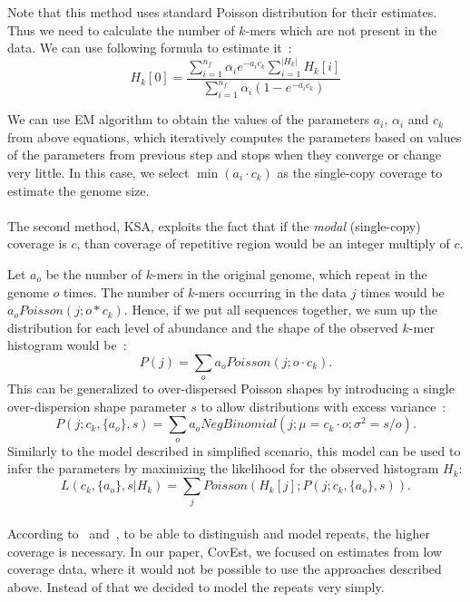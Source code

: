 Note that this method uses standard Poisson distribution for their estimates. Thus we need to calculate the number of $k$-mers which are not present in the data. We can use following formula to estimate it~\cite{waterman}:
$$H_k[0] = \frac{\displaystyle\sum_{i=1}^{n_f}\alpha_i e^{-a_i c_k} \sum_{i=1}^{|H_k|}H_k[i]}{\displaystyle\sum_{i=1}^{n_f}\alpha_i\left(1 - e^{-a_i c_k}\right)}$$

We can use EM algorithm to obtain the values of the parameters $a_i,\, \alpha_i$ and $c_k$ from above equations, which iteratively computes the parameters based on values of the parameters from previous step and stops when they converge or change very little. In this case, we select $\min(a_i \cdot c_k)$ as the single-copy coverage to estimate the genome size.

\paragraph{}The second method, KSA\cite{williams}, exploits the fact that if the \emph{modal} (single-copy) coverage is $c$, than coverage of repetitive region would be an integer multiply of $c$.

Let $a_o$ be the number of $k$-mers in the original genome, which repeat in the genome $o$ times.
The number of $k$-mers occurring in the data $j$ times would be $a_o Poisson(j; o*c_k)$. Hence, if we put all sequences together, we sum up the distribution for each level of abundance and the shape of the observed $k$-mer histogram would be~\cite{williams}:
$$P(j) = \sum_o a_o Poisson(j; o\cdot c_k).$$
This can be generalized to over-dispersed Poisson shapes by introducing a single over-dispersion shape parameter $s$ to allow distributions with excess variance~\cite{williams}:
$$P(j; c_k, \{a_o\}, s) = \sum_o a_o NegBinomial(j; \mu=c_k\cdot o;\sigma^2=s/o).$$
Similarly to the model described in simplified scenario, this model can be used to infer the parameters by maximizing the likelihood for the observed histogram $H_k$:
$$L(c_k, \{a_o\}, s | H_k) = \sum_j Poisson(H_k[j]; P(j; c_k, \{a_o\}, s)).$$

\paragraph{} According to~\cite{waterman} and~\cite{williams}, to be able to distinguish and model repeats, the higher coverage is necessary. In our paper, CovEst\cite{covest}, we focused on estimates from low coverage data, where it would not be possible to use the approaches described above. Instead of that we decided to model the repeats very simply.

